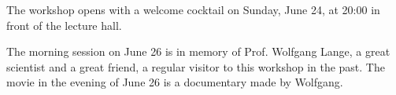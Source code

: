\documentclass[12pt]{report}
\begin{document}
{}


{}


{}


{}


\pagebreak
{}
{}


{}


{}


{\large

\newpage
 \printindex }




\newpage
\thispagestyle{empty}



\vspace{0.5cm}

The workshop opens with a welcome cocktail on Sunday, June 24, at 20:00 in front of the lecture hall.

The morning session on June 26 is in memory of Prof. Wolfgang Lange, a great scientist and a great friend, a regular visitor to this workshop in the past.
The movie in the evening of June 26 is a documentary made by Wolfgang.




\end{document}

